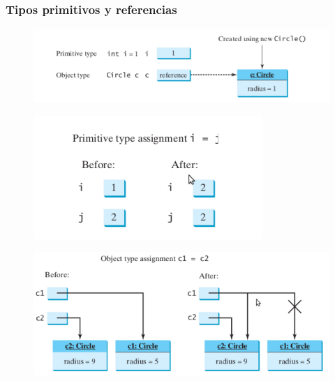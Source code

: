 \documentclass{beamer}
\begin{document}
\begin{frame}
\frametitle{Tipos primitivos y referencias}
\begin{figure}
\includegraphics[scale=0.7]{imagenes/referencia1.png}
\end{figure}

\begin{multicols}{2}
\begin{figure}
\includegraphics[scale=0.6]{imagenes/referencia2.png}
\end{figure}
\begin{figure}
\includegraphics[scale=0.36]{imagenes/referencia3.png}
\end{figure}
\end{multicols}
\end{frame}
\end{document}
